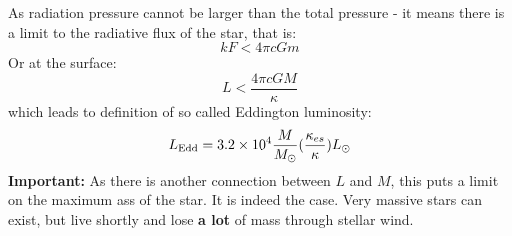 \documentclass[aspectratio=169]{beamer}
\begin{document}
As radiation pressure cannot be larger than the total pressure - it means there is a limit to the radiative flux of the star, that is:
\begin{equation}
k F < 4 \pi c G m
\end{equation}
Or at the surface: 
\begin{equation}
L < \frac{4 \pi c G M}{\kappa}
\end{equation}
which leads to definition of so called Eddington luminosity:
\begin{equation}
L_{\rm Edd} = 3.2 \times 10^4 \frac{M}{M_{\odot}} (\frac{\kappa_{es}}{\kappa}) L_{\odot}
\end{equation}
\textbf{Important:} As there is another connection between $L$ and $M$, this puts a limit on the maximum ass of the star. It is indeed the case. Very massive stars can exist, but live shortly and lose \textbf{a lot} of mass through stellar wind.
\end{document}

